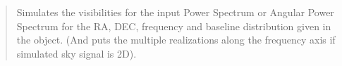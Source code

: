 \documentclass[a4paper,11pt,oneside,english,openany]{sphinxmanual}
\begin{document}
\begin{fulllineitems}
\begin{quote}
\begin{description}
\begin{itemize}
\end{itemize}

\sphinxAtStartPar
Simulates the visibilities for the input Power Spectrum or Angular Power Spectrum for the RA, DEC, frequency and baseline distribution given in the  object. (And puts the multiple realizations along the frequency axis if simulated sky signal is 2D).

\end{description}\end{quote}

\clearpage

\end{fulllineitems}

\end{document}
